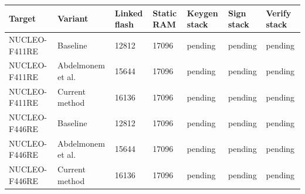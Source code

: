 \begin{tabular}{lllllll}
\hline
Target & Variant & Linked flash & Static RAM & Keygen stack & Sign stack & Verify stack \\
\hline
NUCLEO-F411RE & Baseline & 12812 & 17096 & pending & pending & pending \\
NUCLEO-F411RE & Abdelmonem et al. & 15644 & 17096 & pending & pending & pending \\
NUCLEO-F411RE & Current method & 16136 & 17096 & pending & pending & pending \\
NUCLEO-F446RE & Baseline & 12812 & 17096 & pending & pending & pending \\
NUCLEO-F446RE & Abdelmonem et al. & 15644 & 17096 & pending & pending & pending \\
NUCLEO-F446RE & Current method & 16136 & 17096 & pending & pending & pending \\
\hline
\end{tabular}
